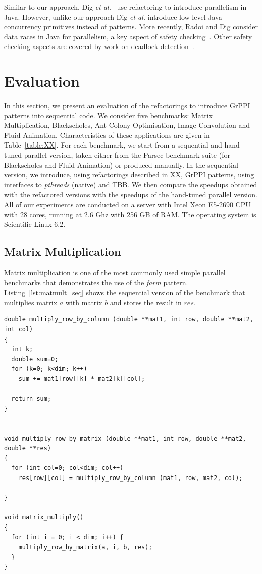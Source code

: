Similar to our approach, Dig \textit{et al.}~\cite{dig} use refactoring to introduce parallelism in Java. However, unlike our approach Dig \textit{et al.} introduce low-level Java concurrency primitives instead of patterns. More recently,  Radoi and Dig consider data races in Java for parallelism, a key aspect of safety checking~\cite{DBLP:journals/tosem/RadoiD15}. Other safety checking aspects are covered by work on deadlock detection~\cite{DBLP:journals/tse/Corbett96}.


\section{Evaluation}

\noindent
In this section, we present an evaluation of the refactorings to introduce GrPPI patterns into sequential code. We consider five benchmarks: Matrix Multiplication, Blackscholes, Ant Colony Optimisation, Image Convolution and Fluid Animation. Characteristics of these applications are given in Table~\ref{table:XX}. For each benchmark, we start from a sequential and hand-tuned parallel version, taken either from the Parsec benchmark suite (for Blackscholes and Fluid Animation) or produced manually. In the sequential version, we introduce, using refactorings described in XX, GrPPI patterns, using interfaces to \emph{pthreads} (native) and TBB. We then compare the speedups obtained with the refactored versions with the speedups of the hand-tuned parallel version. All of our experiments are conducted on a server with Intel Xeon E5-2690 CPU with 28 cores, running at 2.6 Ghz with 256 GB of RAM. The operating system is Scientific Linux 6.2.


\subsection{Matrix Multiplication}

\noindent Matrix multiplication is one of the most commonly used simple parallel benchmarks that demonstrates the use of the \emph{farm} pattern. Listing~\ref{lst:matmult_seq} shows the sequential version of the benchmark that multiplies matrix $a$ with matrix $b$ and stores the result in $res$.

\begin{small}
  \begin{lstlisting}[caption=Sequential Matrix Multiplication\label{lst:matmult_seq}]
double multiply_row_by_column (double **mat1, int row, double **mat2, int col)
{
  int k;
  double sum=0;
  for (k=0; k<dim; k++)
    sum += mat1[row][k] * mat2[k][col];

  return sum;
}


void multiply_row_by_matrix (double **mat1, int row, double **mat2, double **res)
{
  for (int col=0; col<dim; col++)
    res[row][col] = multiply_row_by_column (mat1, row, mat2, col);

}

void matrix_multiply()
{
  for (int i = 0; i < dim; i++) {
    multiply_row_by_matrix(a, i, b, res);
  }
}
  \end{lstlisting}
  
\end{small}

